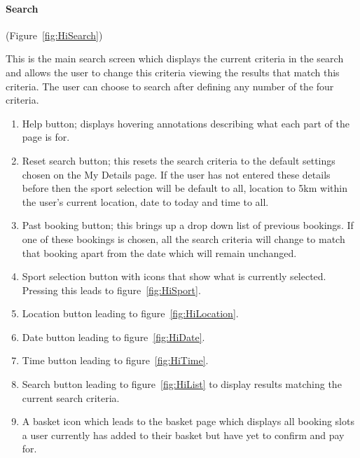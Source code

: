 \paragraph{Search} (Figure~\ref{fig:HiSearch})


This is the main search screen which displays the current criteria in the
search and allows the user to change this criteria viewing the results that
match this criteria. The user can choose to search after defining any number of
the four criteria.
\begin{enumerate}
	\item Help button; displays hovering annotations describing what each part
		of the page is for.
	\item Reset search button; this resets the search criteria to the default
		settings chosen on the My Details page. If the user has not entered
		these details before then the sport selection will be default to all,
		location to 5km within the user's current location, date to today and
		time to all.
	\item Past booking button; this brings up a drop down list of previous
		bookings. If one of these bookings is chosen, all the search criteria
		will change to match that booking apart from the date which will remain
		unchanged.
	\item Sport selection button with icons that show what is currently
		selected.  Pressing this leads to figure~\ref{fig:HiSport}.
	\item Location button leading to figure~\ref{fig:HiLocation}.
	\item Date button leading to figure~\ref{fig:HiDate}.
	\item Time button leading to figure~\ref{fig:HiTime}.
	\item Search button leading to figure~\ref{fig:HiList} to display results
		matching the current search criteria.
	\item A basket icon which leads to the basket page which displays all
		booking slots a user currently has added to their basket but have yet
		to confirm and pay for.
\end{enumerate}

